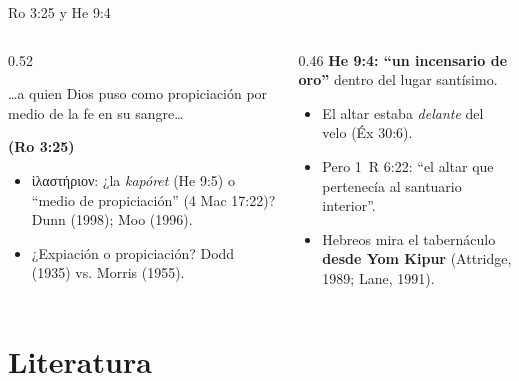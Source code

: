 \documentclass[hyperref={bookmarks=false},aspectratio=169]{beamer}
\newcommand{\grc}[1]{\foreignlanguage{ancientgreek}{#1}}
\newcommand{\fuente}[1]{\par\hfill{\upshape\bfseries\footnotesize\textcolor{tierraroja}{#1}}}
\newcommand{\destacar}[1]{\textbf{\textcolor{tierraroja}{#1}}}
\begin{document}
\begin{frame}{Ro 3:25 y He 9:4}
\begin{columns}[t,onlytextwidth]
\begin{column}{0.52\textwidth}
\begin{cita}\ldots{}a quien Dios puso como propiciación por medio de la fe en su sangre\ldots\fuente{(Ro 3:25)}\end{cita}
\scriptsize
\begin{itemize}
\item \grc{ἱλαστήριον}: ¿la \emph{kapóret} (He 9:5) o ``medio de propiciación'' (4 Mac 17:22)? Dunn (1998); Moo (1996).
\item ¿Expiación o propiciación? Dodd (1935) vs. Morris (1955).
\end{itemize}
\end{column}
\begin{column}{0.46\textwidth}\scriptsize
\destacar{He 9:4: ``un incensario de oro''} dentro del lugar santísimo.
\begin{itemize}
\item El altar estaba \emph{delante} del velo (Éx 30:6).
\item Pero 1~R 6:22: ``el altar que pertenecía al santuario interior''.
\item Hebreos mira el tabernáculo \destacar{desde Yom Kipur} (Attridge, 1989; Lane, 1991).
\end{itemize}
\end{column}
\end{columns}
\end{frame}

\section{Literatura}
\end{document}

